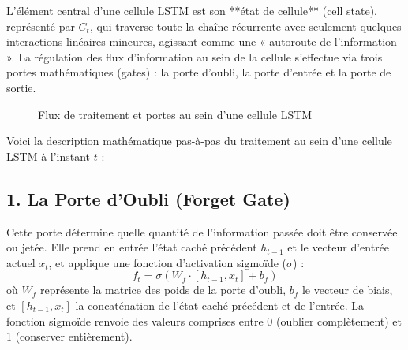 L'élément central d'une cellule LSTM est son **état de cellule** (cell state), représenté par $C_t$, qui traverse toute la chaîne récurrente avec seulement quelques interactions linéaires mineures, agissant comme une « autoroute de l'information ». La régulation des flux d'information au sein de la cellule s'effectue via trois portes mathématiques (gates) : la porte d'oubli, la porte d'entrée et la porte de sortie.

\begin{figure}[h]
    \centering
    \caption{Flux de traitement et portes au sein d'une cellule LSTM}
    \label{fig:lstm_cell}
\end{figure}

Voici la description mathématique pas-à-pas du traitement au sein d'une cellule LSTM à l'instant $t$ :

\subsection{1. La Porte d'Oubli (Forget Gate)}
Cette porte détermine quelle quantité de l'information passée doit être conservée ou jetée. Elle prend en entrée l'état caché précédent $h_{t-1}$ et le vecteur d'entrée actuel $x_t$, et applique une fonction d'activation sigmoïde ($\sigma$) :
\begin{equation}
    f_t = \sigma(W_f \cdot [h_{t-1}, x_t] + b_f)
\end{equation}
où $W_f$ représente la matrice des poids de la porte d'oubli, $b_f$ le vecteur de biais, et $[h_{t-1}, x_t]$ la concaténation de l'état caché précédent et de l'entrée. La fonction sigmoïde renvoie des valeurs comprises entre 0 (oublier complètement) et 1 (conserver entièrement).

